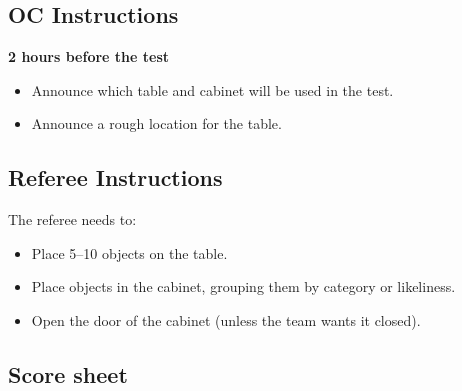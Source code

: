 \subsection*{OC Instructions}

\textbf{2 hours before the test}
\begin{itemize}
	\item Announce which table and cabinet will be used in the test.
	\item Announce a rough location for the table.
\end{itemize}

\subsection*{Referee Instructions}

The referee needs to:
\begin{itemize}
	\item Place 5--10 objects on the table.
	\item Place objects in the cabinet, grouping them by category or likeliness.
	\item Open the door of the cabinet (unless the team wants it closed).
\end{itemize}


\subsection*{Score sheet}


